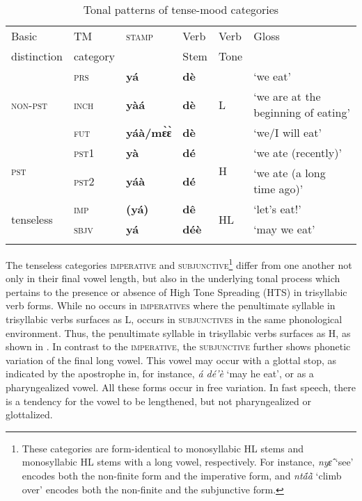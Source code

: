 \begin{table}
\small
\begin{tabularx}{\textwidth}{ll@{} llX l}
 \lsptoprule
Basic  & TM  & \textsc{stamp} & Verb& Verb & Gloss\\
 distinction &  category &  & Stem & Tone &   \\
 \midrule
 & \textsc{prs} & {\bfseries yá} &  {\bfseries dè} & \multirow{3}{*}{L} &  `we eat' \\
\textsc{non-pst} & \textsc{inch} & {\bfseries yàá} & {\bfseries dè} & &  `we are at the beginning of eating' \\
 & \textsc{fut} & {\bfseries yáà/mɛ̀ɛ̀} &  {\bfseries dè}  & &  `we/I will eat' \\
 \midrule
\multirow{2}{*}{\textsc{pst}} &  \textsc{pst1} & {\bfseries yà} &  {\bfseries dé} & \multirow{2}{*}{H} &  `we ate (recently)' \\
 & \textsc{pst2} & {\bfseries yáà} & {\bfseries dé} & &  `we ate (a long time ago)' \\
 \midrule
\multirow{2}{*}{tenseless} & \textsc{imp} &  {\bfseries (yá)}  & {\bfseries dê}    & \multirow{2}{*}{HL} &  `let's eat!' \\
 & \textsc{sbjv} & {\bfseries yá}  & {\bfseries déè} & &  `may we eat' \\
 \lspbottomrule
\end{tabularx}
\caption{Tonal patterns of tense-mood categories}
\label{Tab:TM-Tone}
\end{table}

The tenseless categories \textsc{imperative} and \textsc{subjunctive}\footnote{These categories are form-identical to monosyllabic HL stems and monosyllabic HL stems with a long vowel, respectively. For instance, {\itshape nyɛ̂} `see' encodes both the non-finite form and the imperative form, and {\itshape ntã́ã̀} `climb over' encodes both the non-finite and the subjunctive form.} differ from one another not only in their final vowel length, but also in the underlying tonal process which pertains to the presence or absence of High Tone Spreading (HTS) in trisyllabic verb forms. While no {\HTS} occurs in \textsc{imperatives} where the penultimate syllable in trisyllabic verbs surfaces as L, {\HTS} occurs in \textsc{subjunctives} in the same phonological environment. Thus, the penultimate syllable in trisyllabic verbs surfaces as H, as shown in . In contrast to the \textsc{imperative}, the \textsc{subjunctive} further shows phonetic variation of the final long vowel. This vowel may occur with a glottal stop, as indicated by the apostrophe in, for instance, {\itshape á dé'è} `may he eat', or as a pharyngealized vowel. All these forms occur in free variation. In fast speech, there is a tendency for the vowel to be lengthened, but not pharyngealized or glottalized.


